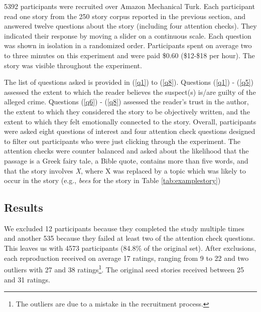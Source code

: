 \documentclass[10pt,letterpaper]{article}
\begin{document}
5392 participants were recruited over Amazon Mechanical Turk. Each participant read one story from the 250 story corpus reported in the previous section, and answered twelve questions about the story (including four attention checks). They indicated their response by moving a slider on a continuous scale. Each question was shown in isolation in a randomized order. Participants spent on average two to three minutes on this experiment and were paid \$0.60 (\$12-\$18 per hour). The story was visible throughout the experiment.


The list of questions asked is provided in (\ref{q1}) to (\ref{q8}). Questions (\ref{q1}) - (\ref{q5}) assessed the extent to which the reader believes the suspect(s) is/are guilty of the alleged crime. Questions (\ref{q6}) - (\ref{q8}) assessed the  reader's trust in the author, the extent to which they considered the story to be objectively written, and the extent to which they felt emotionally connected to the story. Overall, participants were asked eight questions of interest and four attention check questions designed to filter out participants who were just clicking through the experiment. The attention checks were counter balanced and asked about the likelihood that the passage is a Greek fairy tale, a Bible quote, contains more than five words, and that the story involves \textit{X}, where X was replaced by a topic which was likely to occur in the story (e.g., \textit{bees} for the story in Table \ref{tab:examplestory})



\subsection{Results}

We excluded 12 participants because they completed the study multiple times and another 535 because they failed at least two of the attention check questions. This leaves us with 4573 participants (84.8\% of the original set). After exclusions, each reproduction received on average 17 ratings, ranging from 9 to 22 and two outliers with 27 and 38 ratings\footnote{The outliers are due to a mistake in the recruitment process.}. The original seed stories received between 25 and 31 ratings.
\end{document}
